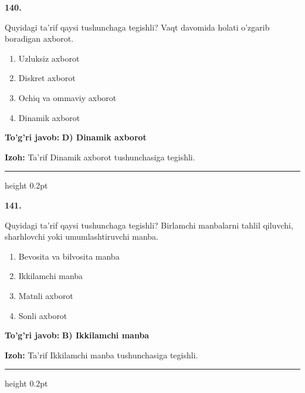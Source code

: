 \documentclass[10pt,a4paper,oneside]{article}
\begin{document}
\noindent\textbf{\color{ink}140.}
\par
Quyidagi ta'rif qaysi tushunchaga tegishli? Vaqt davomida holati o'zgarib boradigan axborot.
\begin{enumerate}[label=\Alph*),leftmargin=9mm]
\item Uzluksiz axborot
\item Diskret axborot
\item Ochiq va ommaviy axborot
\item Dinamik axborot
\end{enumerate}
\begin{tcolorbox}[enhanced,breakable,colback=teal!4,colframe=teal!50!black,boxrule=0.5pt,arc=1.1mm,left=3mm,right=3mm,top=1.7mm,bottom=1.7mm,before skip=2mm,after skip=2mm]
\textbf{\color{teal}To'g'ri javob:} \textbf{D) Dinamik axborot}
\par\smallskip
\textbf{Izoh:} Ta'rif Dinamik axborot tushunchasiga tegishli.
\end{tcolorbox}
\vspace{2mm}\hrule height 0.2pt \vspace{3mm}

\noindent\textbf{\color{ink}141.}
\par
Quyidagi ta'rif qaysi tushunchaga tegishli? Birlamchi manbalarni tahlil qiluvchi, sharhlovchi yoki umumlashtiruvchi manba.
\begin{enumerate}[label=\Alph*),leftmargin=9mm]
\item Bevosita va bilvosita manba
\item Ikkilamchi manba
\item Matnli axborot
\item Sonli axborot
\end{enumerate}
\begin{tcolorbox}[enhanced,breakable,colback=teal!4,colframe=teal!50!black,boxrule=0.5pt,arc=1.1mm,left=3mm,right=3mm,top=1.7mm,bottom=1.7mm,before skip=2mm,after skip=2mm]
\textbf{\color{teal}To'g'ri javob:} \textbf{B) Ikkilamchi manba}
\par\smallskip
\textbf{Izoh:} Ta'rif Ikkilamchi manba tushunchasiga tegishli.
\end{tcolorbox}
\vspace{2mm}\hrule height 0.2pt \vspace{3mm}
\end{document}

